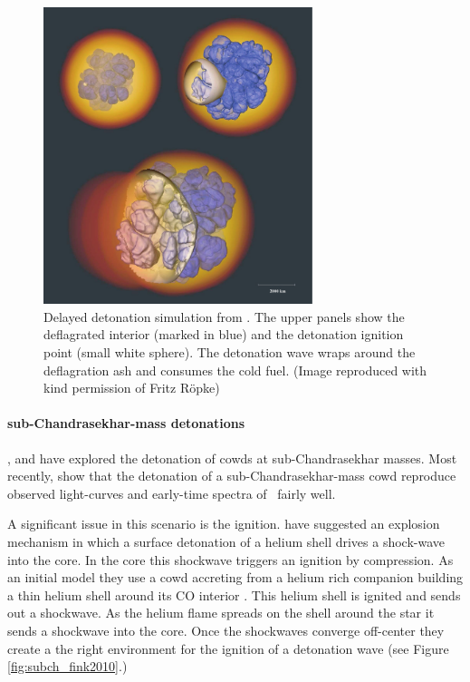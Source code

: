 \begin{figure}[htbp] %
   \centering
   \includegraphics[width=0.7\textwidth]{chapter_intro/plots/ddt_roepke08.pdf}
   \caption{ Delayed detonation simulation from \citet{2008NJPh...10l5009R}. The upper panels show the deflagrated interior (marked in blue) and the detonation ignition point (small white sphere). The detonation wave wraps around the deflagration ash and consumes the cold fuel. (Image reproduced with kind permission of Fritz R\"{o}pke)}
   \label{fig:snia_ddt_roepke2007}
\end{figure}


\paragraph{sub-Chandrasekhar-mass detonations}
\label{sec:subchandra}
\citet{1992ApJ...386L..13S}, \citet{1995ApJ...452...62L} and \citet{2010ApJ...714L..52S} have explored the detonation of \glspl{cowd} at sub-Chandrasekhar masses. Most recently, \citet{2010ApJ...714L..52S} show that the detonation of a sub-Chandrasekhar-mass \gls{cowd} reproduce observed light-curves and early-time spectra of \sneia\ fairly well.

A significant issue in this scenario is the ignition. \cite{2010A&A...514A..53F} have suggested an explosion mechanism in which a surface detonation of a helium shell drives a shock-wave into the core. In the core this shockwave triggers an ignition by compression.  As an initial model they use a \gls{cowd} accreting from a helium rich companion building a thin helium shell around its CO interior \citep[described in][]{2007ApJ...662L..95B}. This helium shell is ignited and sends out a shockwave. As the helium flame spreads on the shell around the star it sends a shockwave into the core. Once the shockwaves converge off-center they create a the right environment for the ignition of a detonation wave (see Figure \ref{fig:subch_fink2010}.) 

